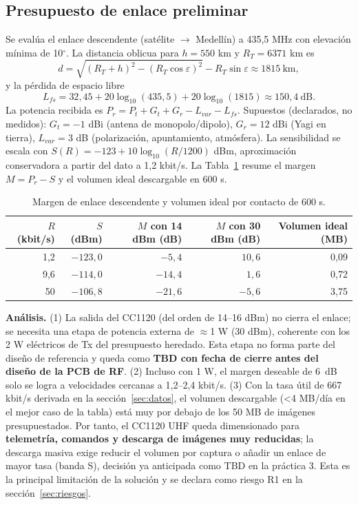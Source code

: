 \documentclass[11pt,letterpaper]{article}
\begin{document}
\subsection{Presupuesto de enlace preliminar}
\label{sec:enlace}
Se evalúa el enlace descendente (satélite $\rightarrow$ Medellín) a 435,5 MHz con elevación mínima de 10$^\circ$. La distancia oblicua para $h=550$ km y $R_T=6371$ km es
\begin{equation}
d=\sqrt{(R_T+h)^2-(R_T\cos\varepsilon)^2}-R_T\sin\varepsilon\approx1815\ \mathrm{km},
\end{equation}
y la pérdida de espacio libre
\begin{equation}
L_{fs}=32{,}45+20\log_{10}(435{,}5)+20\log_{10}(1815)\approx150{,}4\ \mathrm{dB}.
\end{equation}
La potencia recibida es $P_r=P_t+G_t+G_r-L_{var}-L_{fs}$. Supuestos (declarados, no medidos): $G_t=-1$ dBi (antena de monopolo/dipolo), $G_r=12$ dBi (Yagi en tierra), $L_{var}=3$ dB (polarización, apuntamiento, atmósfera). La sensibilidad se escala con $S(R)=-123+10\log_{10}(R/1200)$ dBm, aproximación conservadora a partir del dato a 1,2 kbit/s. La Tabla~\ref{tab:enlace} resume el margen $M=P_r-S$ y el volumen ideal descargable en 600 s.

\begin{table}[h]
\centering\small
\caption{Margen de enlace descendente y volumen ideal por contacto de 600 s.}\label{tab:enlace}
\begin{tabular}{rrrrr}
\toprule $R$ (kbit/s) & $S$ (dBm) & $M$ con 14 dBm (dB) & $M$ con 30 dBm (dB) & Volumen ideal (MB) \\
\midrule
1,2 & $-123{,}0$ & $-5{,}4$ & $10{,}6$ & 0,09 \\
9,6 & $-114{,}0$ & $-14{,}4$ & $1{,}6$ & 0,72 \\
50 & $-106{,}8$ & $-21{,}6$ & $-5{,}6$ & 3,75 \\
\bottomrule
\end{tabular}
\end{table}

\textbf{Análisis.} (1) La salida del CC1120 (del orden de 14--16 dBm) no cierra el enlace; se necesita una etapa de potencia externa de $\approx$1 W (30 dBm), coherente con los 2 W eléctricos de Tx del presupuesto heredado. Esta etapa no forma parte del diseño de referencia y queda como \textbf{TBD con fecha de cierre antes del diseño de la PCB de RF}. (2) Incluso con 1 W, el margen deseable de 6~dB solo se logra a velocidades cercanas a 1,2--2,4 kbit/s. (3) Con la tasa útil de 667 kbit/s derivada en la sección~\ref{sec:datos}, el volumen descargable (<4 MB/día en el mejor caso de la tabla) está muy por debajo de los 50 MB de imágenes presupuestados. Por tanto, el CC1120 UHF queda dimensionado para \textbf{telemetría, comandos y descarga de imágenes muy reducidas}; la descarga masiva exige reducir el volumen por captura o añadir un enlace de mayor tasa (banda S), decisión ya anticipada como TBD en la práctica 3. Esta es la principal limitación de la solución y se declara como riesgo R1 en la sección~\ref{sec:riesgos}.
\end{document}
